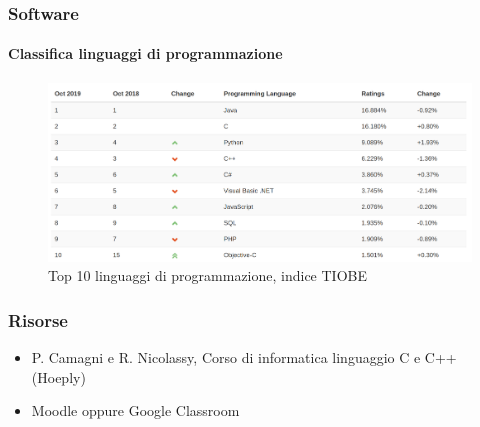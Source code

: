 \documentclass[11pt]{beamer}
\begin{document}
    \begin{frame}
        \frametitle{Software}
        \framesubtitle{Classifica linguaggi di programmazione}
        
        \begin{figure}
            \includegraphics[scale=0.2]{img/classifica-lp-tiobe.png}
            \caption{Top 10 linguaggi di programmazione, indice TIOBE}
        \end{figure}
    \end{frame}

    \begin{frame}
        \frametitle{Risorse}
        
        \begin{itemize}
            \item P. Camagni e R. Nicolassy, Corso di informatica linguaggio C e C++ (Hoeply)
            \item Moodle oppure Google Classroom
        \end{itemize}
    \end{frame}
\end{document}
